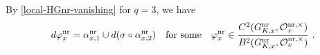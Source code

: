 \documentclass[a4paper]{amsart}
\theoremstyle{definition}
\numberwithin{equation}{section}
\begin{document}

By \eqref{local-HGnr-vanishing} for $q=3$, we have
\begin{align}\label{BFnrx-lift}
    d\varphi_x^\mathrm{nr}=\alpha_{x,1}^\mathrm{nr}\cup d(\sigma\circ\alpha_{x,2}^\mathrm{nr})\quad\textrm{for some}\quad\varphi_x^\mathrm{nr}\in\frac{C^2(G_{K,x}^\mathrm{nr},\mathcal{O}_x^{\mathrm{nr},\times})}{B^2(G_{K,x}^\mathrm{nr},\mathcal{O}_x^{\mathrm{nr},\times})}\rlap{\ .}
\end{align}
\end{document}
